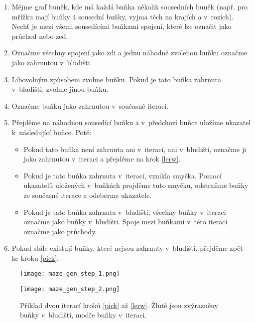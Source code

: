 \begin{enumerate}
  \setcounter{enumi}{0}
  \item Mějme graf buněk, kde má každá buňka několik sousedních buněk (např. pro mřížku mají buňky 4 sousední buňky, vyjma těch na krajích a v~rozích). Nechť je mezi všemi sousedícími buňkami spojení, které lze označit jako průchod nebo zeď.
  \item Označme všechny spojení jako zdi a jednu náhodně zvolenou buňku označme jako zahrnutou v~bludišti. \label{init}
  \item Libovolným způsobem zvolme buňku. Pokud je tato buňka zahrnuta v~bludišti, zvolme jinou buňku. \label{pick}
  \item Označme buňku jako zahrnutou v~současné iteraci.
  \item Přejděme na náhodnou sousedící buňku a v~předchozí buňce uložíme ukazatel k~následující buňce. Poté: \label{lerw}
        \begin{itemize}
          \item Pokud tato buňka není zahrnuta ani v~iteraci, ani v~bludišti, označme ji jako zahrnutou v~iteraci a přejděme na krok \ref{lerw}.
          \item Pokud je tato buňka zahrnuta v~iteraci, vznikla smyčka. Pomocí ukazatelů uložených v~buňkách projděme tuto smyčku, odstraňme buňky ze současné iterace a odeberme ukazatele.
          \item Pokud je tato buňka zahrnuta v~bludišti, všechny buňky v~iteraci označme jako buňky v~bludišti. Spoje mezi buňkami v~této iteraci označme jako průchody.
        \end{itemize}
  \item Pokud stále existují buňky, které nejsou zahrnuty v~bludišti, přejděme zpět ke kroku \ref{pick}.
\end{enumerate}

\begin{figure}[H]
  \centering

  \begin{minipage}{.5\textwidth}
    \centering
    \texttt{[image: maze\_gen\_step\_1.png]}
  \end{minipage}%
  \begin{minipage}{.5\textwidth}
    \centering
    \texttt{[image: maze\_gen\_step\_2.png]}
  \end{minipage}

  \caption{Příklad dvou iterací kroků \ref{pick} až \ref{lerw}. Žlutě jsou zvýrazněny buňky v~bludišti, modře buňky v~iteraci.}
\end{figure}

